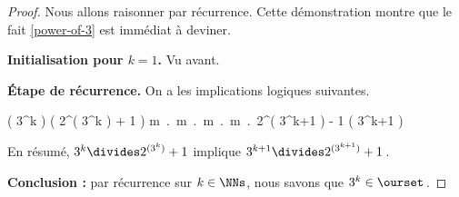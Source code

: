 \begin{proof}
	Nous allons raisonner par récurrence. Cette démonstration montre que le fait \ref{power-of-3} est immédiat à deviner.
    
    \medskip
    
    \textbf{Initialisation pour $k = 1$.}    
    Vu avant.
    
    
    \medskip
    
    \textbf{Étape de récurrence.}    
    On a les implications logiques suivantes.
    
    \medskip
    
    \begin{stepcalc}[style=ar*, ope=\implies]
    	( 3^k ) \divides \Big( 2^{( 3^k )} + 1 \Big)
    \explnext{}
    	\exists m \in \ZZ \,.\, \Big[ 2^{( 3^k )} + 1 = m \cdot 3^k  \Big]
    \explnext{}
    	\exists m \in \ZZ \,.\, \Big[ 2^{( 3^k )} = - 1 + m \cdot 3^k  \Big]
    \explnext{}
    	\exists m \in \ZZ \,.\, \Big[ \big( 2^{( 3^k )} \big)^3 = \big( - 1 + m \cdot 3^k \big)^3  \Big]
    \explnext{}
    	\exists m \in \ZZ \,.\, \Big[ 2^{( 3^{k+1} )} = - 1 + 3 \cdot m \cdot 3^k - 3 \cdot \big( m \cdot 3^k \big)^2 + \big( m \cdot 3^k \big)^3  \Big]
    	2^{( 3^{k+1} )} \equiv - 1 \mod\!( 3^{k+1} )
    \end{stepcalc}
    
    \smallskip
    
    En résumé, 
    $3^k \divides 2^{( 3^k )} + 1$ 
    implique
    $3^{k+1} \divides 2^{( 3^{k+1} )} + 1$\,.
    
    \medskip
    
    \textbf{Conclusion :} par récurrence sur $k \in \NNs$, nous savons que $3^k \in \ourset$\,.
\end{proof}


